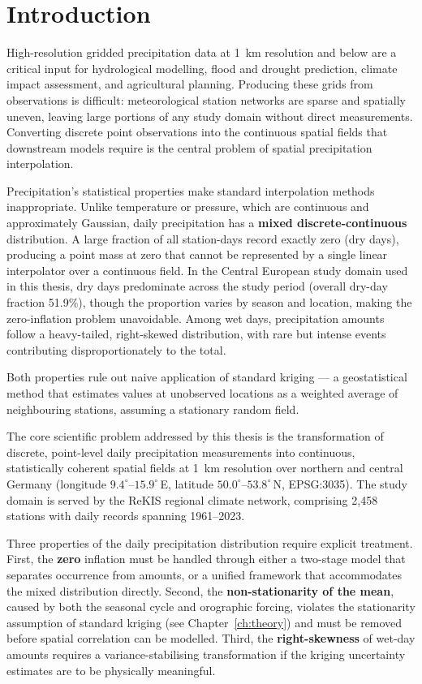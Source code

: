 \chapter{Introduction}
\label{ch:introduction}

High-resolution gridded precipitation data at 1~km resolution and below are
a critical input for hydrological modelling, flood and drought prediction,
climate impact assessment, and agricultural planning.
Producing these grids from observations is difficult: meteorological station
networks are sparse and spatially uneven, leaving large portions of any study
domain without direct measurements.
Converting discrete point observations into the continuous spatial fields
that downstream models require is the central problem of spatial precipitation
interpolation.

Precipitation's statistical properties make standard interpolation methods
inappropriate.
Unlike temperature or pressure, which are continuous and approximately
Gaussian, daily precipitation has a \textbf{mixed discrete-continuous} distribution.
A large fraction of all station-days record exactly zero (dry days), producing
a point mass at zero that cannot be represented by a single linear interpolator over a continuous field.
In the Central European study domain used in this thesis, dry days predominate
across the study period (overall dry-day fraction 51.9\%), though the proportion
varies by season and location, making the zero-inflation problem unavoidable.
Among wet days, precipitation amounts follow a heavy-tailed, right-skewed
distribution, with rare but intense events contributing disproportionately to
the total.

Both properties rule out naive application of standard kriging — a geostatistical method that estimates values at unobserved locations as a weighted average of neighbouring stations, assuming a stationary random field.

The core scientific problem addressed by this thesis is the transformation of
discrete, point-level daily precipitation measurements into continuous,
statistically coherent spatial fields at 1~km resolution over northern and
central Germany
(longitude $9.4^\circ$--$15.9^\circ$\,E, latitude $50.0^\circ$--$53.8^\circ$\,N,
EPSG:3035).
The study domain is served by the ReKIS regional climate network, comprising
2{,}458 stations with daily records spanning 1961--2023.

Three properties of the daily precipitation distribution require explicit treatment.
First, the \textbf{zero} inflation must be handled through either a two-stage model
that separates occurrence from amounts, or a unified framework that accommodates
the mixed distribution directly.
Second, the \textbf{non-stationarity of the mean}, caused by both the seasonal
cycle and orographic forcing, violates the stationarity assumption of standard
kriging (see Chapter~\ref{ch:theory}) and must be removed before spatial correlation can be modelled.
Third, the \textbf{right-skewness} of wet-day amounts requires a
variance-stabilising transformation if the kriging uncertainty estimates are
to be physically meaningful.

